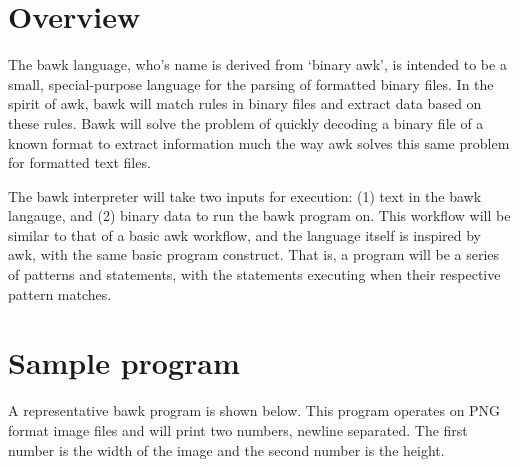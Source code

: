 \section{Overview}
The bawk language, who's name is derived from `binary awk', is intended to be a small, special-purpose language for the parsing of formatted binary files.  In the spirit of awk, bawk will match rules in binary files and extract data based on these rules.  Bawk will solve the problem of quickly decoding a binary file of a known format to extract information much the way awk solves this same problem for formatted text files.

The bawk interpreter will take two inputs for execution: (1) text in the bawk langauge, and (2) binary data to run the bawk program on.  This workflow will be similar to that of a basic awk workflow, and the language itself is inspired by awk, with the same basic program construct.  That is, a program will be a series of patterns and statements, with the statements executing when their respective pattern matches.

\section{Sample program}
A representative bawk program is shown below.  This program operates on PNG format image files and will print two numbers, newline separated.  The first number is the width of the image and the second number is the height. 

